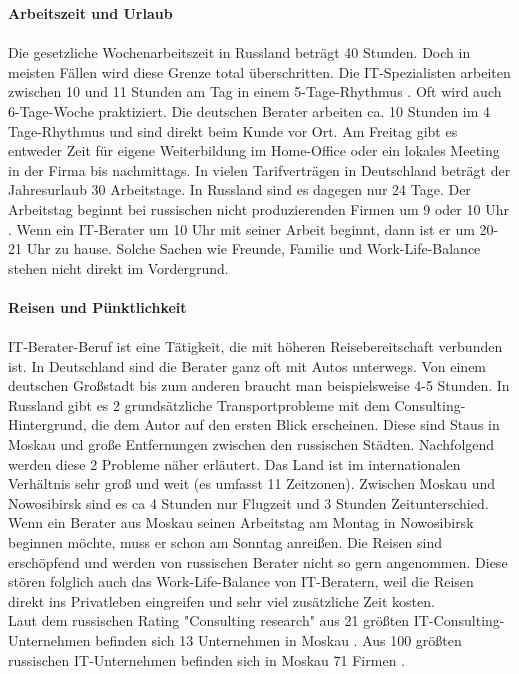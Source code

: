 	 \textbf{Arbeitszeit und Urlaub}\\
	 \\
	 Die gesetzliche Wochenarbeitszeit in Russland beträgt 40 Stunden. Doch in meisten Fällen wird diese Grenze total überschritten. Die IT-Spezialisten arbeiten zwischen 10 und 11 Stunden am Tag in einem 5-Tage-Rhythmus \cite{ArbZeitRU}. 
	  Oft wird auch 6-Tage-Woche praktiziert. Die deutschen Berater arbeiten ca. 10 Stunden  im 4 Tage-Rhythmus und sind direkt beim Kunde vor Ort. Am Freitag gibt es entweder Zeit für eigene Weiterbildung im Home-Office oder ein lokales Meeting in der Firma bis nachmittags.
	 In vielen Tarifverträgen in Deutschland beträgt der Jahresurlaub 30 Arbeitstage. In Russland sind es dagegen nur 24 Tage. Der Arbeitstag beginnt bei russischen nicht produzierenden Firmen um 9 oder 10 Uhr \cite{ArbZeitRU}. Wenn ein IT-Berater um 10 Uhr mit seiner Arbeit beginnt, dann ist er um 20-21 Uhr zu hause. Solche Sachen wie Freunde, Familie und Work-Life-Balance stehen nicht direkt im Vordergrund.   \\ \\
	 \textbf{Reisen und Pünktlichkeit}\\
	 \\
	 IT-Berater-Beruf ist eine Tätigkeit, die mit höheren Reisebereitschaft verbunden ist. In Deutschland sind die Berater ganz oft mit Autos unterwegs. Von einem deutschen Großstadt bis zum anderen braucht man beispielsweise 4-5 Stunden. In Russland gibt es 2 grundsätzliche Transportprobleme mit dem Consulting-Hintergrund, die dem Autor auf den ersten Blick erscheinen. Diese sind Staus in Moskau und große Entfernungen zwischen den russischen Städten. Nachfolgend werden diese 2 Probleme näher erläutert. Das Land ist im internationalen Verhältnis sehr groß und weit (es umfasst 11 Zeitzonen).
	 Zwischen Moskau und Nowosibirsk sind es ca 4 Stunden nur Flugzeit und 3 Stunden Zeitunterschied. Wenn ein Berater aus Moskau seinen Arbeitstag am Montag in Nowosibirsk beginnen möchte, muss er schon am Sonntag anreißen. Die Reisen sind erschöpfend und werden von russischen Berater nicht so gern angenommen. Diese stören folglich auch das Work-Life-Balance von IT-Beratern, weil die Reisen direkt ins Privatleben eingreifen und sehr viel zusätzliche Zeit kosten.\\
	 Laut dem russischen Rating "Consulting research" aus 21 größten IT-Consulting-Unternehmen befinden sich 13 Unternehmen in Moskau \cite{RaitConsRU}.
	 Aus 100 größten russischen IT-Unternehmen befinden sich in Moskau 71 Firmen \cite{100BigITConsURU}. 
